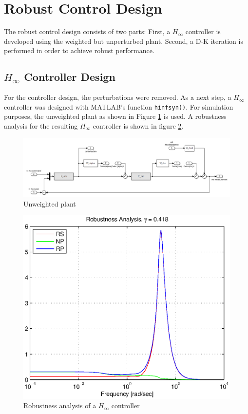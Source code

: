 \documentclass[conference]{IEEEtran}
\begin{document}
\section{Robust Control Design}

The robust control design consists of two parts: First, a $H_{\infty}$ controller is developed using the weighted but unperturbed plant. Second, a D-K iteration is performed in order to achieve robust performance.

\subsection{$H_{\infty}$ Controller Design}

For the controller design, the perturbations were removed. As a next step, a $H_{\infty}$ controller was designed with \textsc{MATLAB}'s function \texttt{hinfsyn()}. For simulation purposes, the unweighted plant as shown in Figure \ref{figure:model_car_unweighted} is used. A robustness analysis for the resulting $H_{\infty}$ controller is shown in figure \ref{figure:RP_before_DK}.

\begin{figure}[h]
\centering
  \includegraphics[width=.47\textwidth]{pics/model_car_unweighted.png} 
  \caption{Unweighted plant}  
  \label{figure:model_car_unweighted}
\end{figure}


\begin{figure}[h]
\centering
  \includegraphics[width=.47\textwidth]{pics/RP_before_DK} 
  \caption{Robustness analysis of a $H_{\infty}$ controller}  
  \label{figure:RP_before_DK}
\end{figure}
\end{document}
